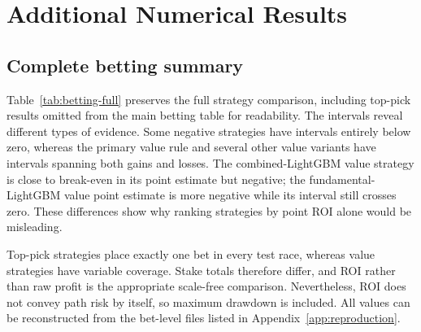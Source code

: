 \section{Additional Numerical Results}\label{app:numerical}

\subsection{Complete betting summary}\label{app:betting}
Table~\ref{tab:betting-full} preserves the full strategy comparison, including top-pick results omitted from the main betting table for readability. The intervals reveal different types of evidence. Some negative strategies have intervals entirely below zero, whereas the primary value rule and several other value variants have intervals spanning both gains and losses. The combined-LightGBM value strategy is close to break-even in its point estimate but negative; the fundamental-LightGBM value point estimate is more negative while its interval still crosses zero. These differences show why ranking strategies by point ROI alone would be misleading.

Top-pick strategies place exactly one bet in every test race, whereas value strategies have variable coverage. Stake totals therefore differ, and ROI rather than raw profit is the appropriate scale-free comparison. Nevertheless, ROI does not convey path risk by itself, so maximum drawdown is included. All values can be reconstructed from the bet-level files listed in Appendix~\ref{app:reproduction}.


